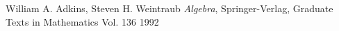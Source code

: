 \documentclass[
11pt, %
catalan, %
singlespacing, %
headsepline, %
consistentlayout, %
]{MastersDoctoralThesis} %
\theoremstyle{definition}
\begin{document}
\begin{thebibliography}{9}
   William A. Adkins, Steven H. Weintraub
  \emph{Algebra},
  Springer-Verlag,
  Graduate Texts in Mathematics Vol. 136
 1992

\end{thebibliography}
\end{document}
